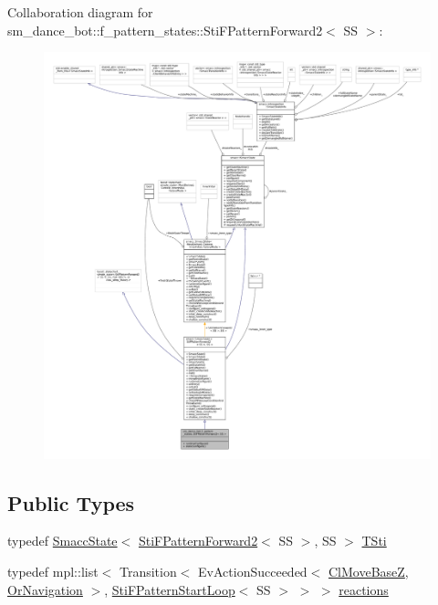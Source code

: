 Collaboration diagram for sm\+\_\+dance\+\_\+bot\+:\+:f\+\_\+pattern\+\_\+states\+:\+:Sti\+F\+Pattern\+Forward2$<$ SS $>$\+:
\nopagebreak
\begin{figure}[H]
\begin{center}
\leavevmode
\includegraphics[width=350pt]{structsm__dance__bot_1_1f__pattern__states_1_1StiFPatternForward2__coll__graph}
\end{center}
\end{figure}
\subsection*{Public Types}
\begin{DoxyCompactItemize}
\item 
typedef \hyperlink{classSmaccState}{Smacc\+State}$<$ \hyperlink{structsm__dance__bot_1_1f__pattern__states_1_1StiFPatternForward2}{Sti\+F\+Pattern\+Forward2}$<$ SS $>$, SS $>$ \hyperlink{structsm__dance__bot_1_1f__pattern__states_1_1StiFPatternForward2_a9579984c93060baa23d437238b0b2f9e}{T\+Sti}
\item 
typedef mpl\+::list$<$ Transition$<$ Ev\+Action\+Succeeded$<$ \hyperlink{classcl__move__base__z_1_1ClMoveBaseZ}{Cl\+Move\+BaseZ}, \hyperlink{classsm__dance__bot_1_1OrNavigation}{Or\+Navigation} $>$, \hyperlink{structsm__dance__bot_1_1f__pattern__states_1_1StiFPatternStartLoop}{Sti\+F\+Pattern\+Start\+Loop}$<$ SS $>$ $>$ $>$ \hyperlink{structsm__dance__bot_1_1f__pattern__states_1_1StiFPatternForward2_a16524d739d8b056a6b53bd9122a3f070}{reactions}
\end{DoxyCompactItemize}
